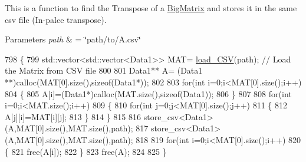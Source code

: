 This is a function to find the Transpose of a \hyperlink{classMATOPS_1_1BigMatrix}{Big\+Matrix} and stores it in the same csv file (In-\/palce transpose). 


\begin{DoxyParams}{Parameters}
{\em path} & = \char`\"{}path/to/\+A.\+csv\char`\"{} \\
\hline
\end{DoxyParams}

\begin{DoxyCode}
798                                         \{
799                                             std::vector<std::vector<Data1>> MAT= 
      \hyperlink{classMATOPS_1_1BigMatrix_a43e1704cb38eb6d0121be5b71014eb8e}{load\_CSV}(path); \textcolor{comment}{// Load the Matrix from CSV file}
800 
801                                             Data1** A= (Data1 **)calloc(MAT[0].size(),\textcolor{keyword}{sizeof}(Data1*));
802 
803                                             \textcolor{keywordflow}{for}(\textcolor{keywordtype}{int} i=0;i<MAT[0].size();i++)
804                                                 \{
805                                                         A[i]=(Data1*)calloc(MAT.size(),\textcolor{keyword}{sizeof}(Data1));
806                                                 \}
807 
808                                                 \textcolor{keywordflow}{for}(\textcolor{keywordtype}{int} i=0;i<MAT.size();i++)
809                                                 \{
810                                                         \textcolor{keywordflow}{for}(\textcolor{keywordtype}{int} j=0;j<MAT[0].size();j++)
811                                                         \{
812                                                                 A[j][i]=MAT[i][j];
813                                                         \}
814                                                 \}
815 
816                                                 store\_csv<Data1>(A,MAT[0].size(),MAT.size(),path);
817                                                 store\_csv<Data1>(A,MAT[0].size(),MAT.size(),path);
818 
819                                                 \textcolor{keywordflow}{for}(\textcolor{keywordtype}{int} i=0;i<MAT[0].size();i++)
820                                                 \{
821                                                         free(A[i]);
822                                                 \}
823                                                 free(A);
824 
825                                         \}
\end{DoxyCode}


